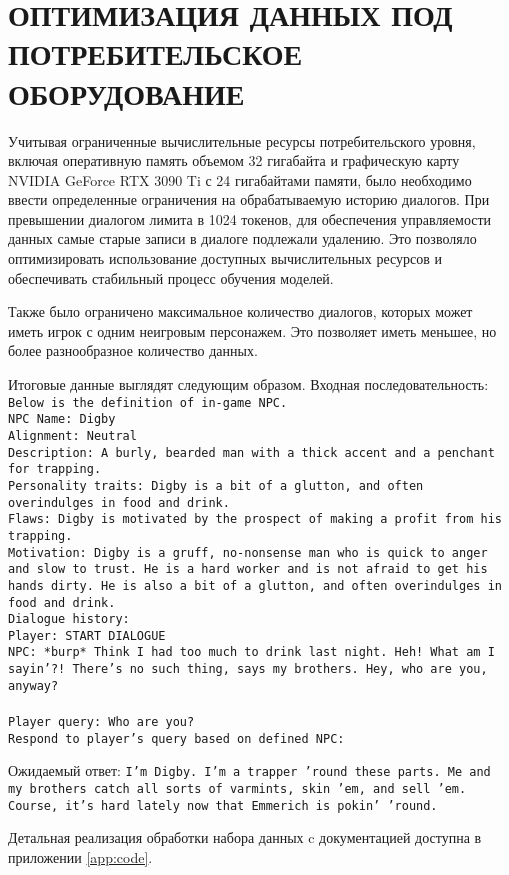 \section{ОПТИМИЗАЦИЯ ДАННЫХ ПОД ПОТРЕБИТЕЛЬСКОЕ ОБОРУДОВАНИЕ}

Учитывая ограниченные вычислительные ресурсы потребительского уровня, включая оперативную память объемом 32 гигабайта и графическую карту NVIDIA GeForce RTX 3090 Ti с 24 гигабайтами памяти, было необходимо ввести определенные ограничения на обрабатываемую историю диалогов. При превышении диалогом лимита в 1024 токенов, для обеспечения управляемости данных самые старые записи в диалоге подлежали удалению. Это позволяло оптимизировать использование доступных вычислительных ресурсов и обеспечивать стабильный процесс обучения моделей. 

Также было ограничено максимальное количество диалогов, которых может иметь игрок с одним неигровым персонажем. Это позволяет иметь меньшее, но более разнообразное количество данных.

Итоговые данные выглядят следующим образом.
Входная последовательность:
\texttt{\\Below is the definition of in-game NPC.\\
    NPC Name: Digby\\
    Alignment: Neutral\\
    Description: A burly, bearded man with a thick accent and a penchant for trapping.\\
    Personality traits: Digby is a bit of a glutton, and often overindulges in food and drink.\\
    Flaws: Digby is motivated by the prospect of making a profit from his trapping.\\
    Motivation: Digby is a gruff, no-nonsense man who is quick to anger and slow to trust. He is a hard worker and is not afraid to get his hands dirty. He is also a bit of a glutton, and often overindulges in food and drink.\\
    Dialogue history:\\
    Player: START DIALOGUE\\
    NPC: *burp* Think I had too much to drink last night. Heh! What am I sayin'?! There's no such thing, says my brothers. Hey, who are you, anyway?\\\\
    Player query: Who are you?\\
    Respond to player's query based on defined NPC:\\}

Ожидаемый ответ: \texttt{I'm Digby. I'm a trapper 'round these parts. Me and my brothers catch all sorts of varmints, skin 'em, and sell 'em. Course, it's hard lately now that Emmerich is pokin' 'round.}

Детальная реализация обработки набора данных c документацией доступна в приложении \ref{app:code}.
